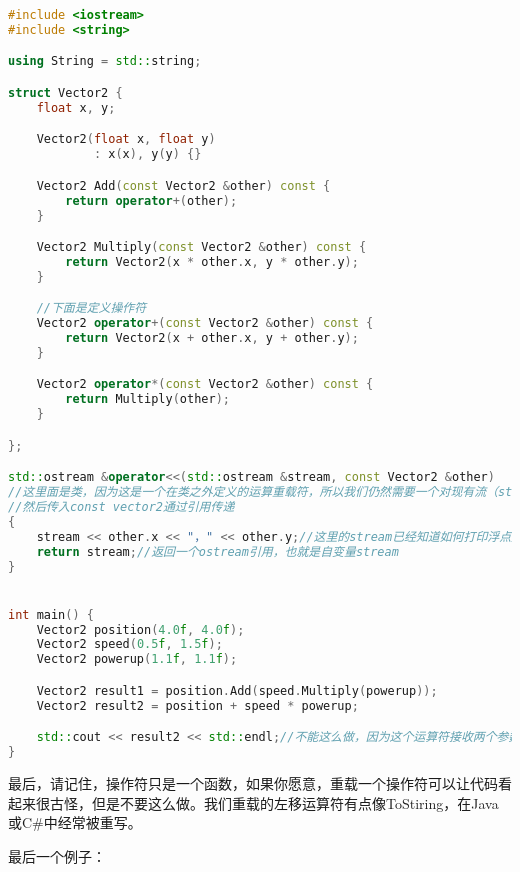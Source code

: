 \begin{lstlisting}[language=c++]
#include <iostream>
#include <string>

using String = std::string;

struct Vector2 {
    float x, y;

    Vector2(float x, float y)
            : x(x), y(y) {}

    Vector2 Add(const Vector2 &other) const {
        return operator+(other);
    }

    Vector2 Multiply(const Vector2 &other) const {
        return Vector2(x * other.x, y * other.y);
    }

    //下面是定义操作符
    Vector2 operator+(const Vector2 &other) const {
        return Vector2(x + other.x, y + other.y);
    }

    Vector2 operator*(const Vector2 &other) const {
        return Multiply(other);
    }

};

std::ostream &operator<<(std::ostream &stream, const Vector2 &other)
//这里面是类，因为这是一个在类之外定义的运算重载符，所以我们仍然需要一个对现有流（stream）的引用，就是cout
//然后传入const vector2通过引用传递
{
    stream << other.x << "，" << other.y;//这里的stream已经知道如何打印浮点数，所以无需对浮点数重载
    return stream;//返回一个ostream引用，也就是自变量stream
}


int main() {
    Vector2 position(4.0f, 4.0f);
    Vector2 speed(0.5f, 1.5f);
    Vector2 powerup(1.1f, 1.1f);

    Vector2 result1 = position.Add(speed.Multiply(powerup));
    Vector2 result2 = position + speed * powerup;

    std::cout << result2 << std::endl;//不能这么做，因为这个运算符接收两个参数，一个是输出流output stream，也就是cout，另一个就是vector2了
}
\end{lstlisting}

最后，请记住，操作符只是一个函数，如果你愿意，重载一个操作符可以让代码看起来很古怪，但是不要这么做。我们重载的左移运算符有点像{\ncodestyle ToStiring}，在Java或C\#中经常被重写。

最后一个例子：

